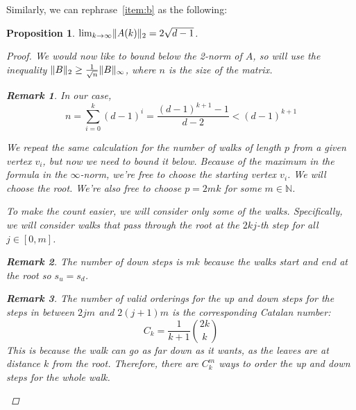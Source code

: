 \documentclass{amsart}
\theoremstyle{plain}
\newtheorem*{proposition}{\textbf{Proposition}}
\theoremstyle{definition}
\newtheorem*{rk}{\textbf{Remark}}
\newcommand{\N}{\mathbb{N}}
\DeclarePairedDelimiter{\norm}{\lVert}{\rVert}
\begin{document}
    Similarly, we can rephrase~\ref{item:b} as the following:
    \begin{proposition}
        $\lim_{k \to \infty} \norm{A(k)}_2 = 2 \sqrt{d - 1}$.

        \begin{proof}
            We would now like to bound \emph{below} the 2-norm of $A$, so will use the inequality
            $\norm{B}_2 \geq \frac{1}{\sqrt{n}} \norm{B}_\infty$, where $n$ is the size of the matrix.
            \begin{rk}
                In our case,
                \begin{equation*}
                    n = \sum_{i=0}^{k} (d-1)^i = \frac{(d-1)^{k+1} - 1}{d-2} < (d-1)^{k+1}
                \end{equation*}
            \end{rk}

            We repeat the same calculation for the number of walks of length $p$ from a given vertex $v_i$,
            but now we need to bound it below.
            Because of the maximum in the formula in the $\infty$-norm,
            we're free to choose the starting vertex $v_i$.
            We will choose the root.
            We're also free to choose $p = 2mk$ for some $m \in \N$.

            To make the count easier, we will consider only some of the walks.
            Specifically, we will consider walks that pass through the root
            at the $2kj$-th step for all $j \in [0, m]$.

            \begin{rk}
                The number of \emph{down} steps is $mk$
                because the walks start and end at the root so $s_u = s_d$.
            \end{rk}

            \begin{rk}
                The number of valid orderings for the \emph{up} and \emph{down}
                steps for the steps in between
                $2jm$ and $2(j+1)m$ is
                the corresponding \emph{Catalan number}:
                \begin{equation*}
                    C_{k} = \frac{1}{k+1} \binom{2k}{k}
                \end{equation*}
                This is because the walk can go as far down as it wants,
                as the leaves are at distance $k$ from the root.
                Therefore, there are $C_k^m$ ways to order the
                \emph{up} and \emph{down} steps for the whole walk.
            \end{rk}


\end{proof}
\end{proposition}
\end{document}
